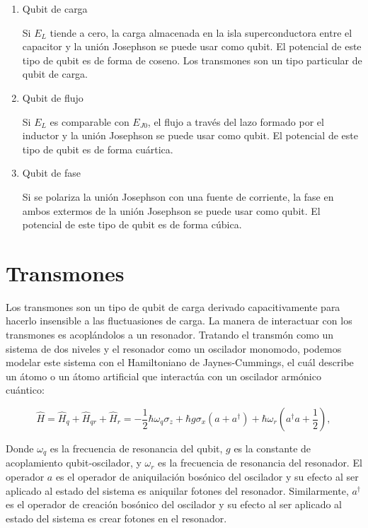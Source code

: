 \begin{enumerate}
    \item Qubit de carga

        Si $E_L$ tiende a cero, la carga almacenada en la isla superconductora entre el capacitor y  la unión Josephson se puede usar como qubit. El potencial de este tipo de qubit es de forma de coseno. Los transmones son un tipo particular de qubit de carga.

    \item Qubit de flujo

        Si $E_L$ es comparable con $E_{J0}$, el flujo a través del lazo formado por el inductor y la unión Josephson se puede usar como qubit. El potencial de este tipo de qubit es de forma cuártica.

    \item Qubit de fase

        Si se polariza la unión Josephson con una fuente de corriente, la fase en ambos extermos de la unión Josephson se puede usar como qubit. El potencial de este tipo de qubit es de forma cúbica.
\end{enumerate}

\section{Transmones}

Los transmones son un tipo de qubit de carga derivado capacitivamente para hacerlo insensible a las fluctuasiones de carga. La manera de interactuar con los transmones es acoplándolos a un resonador. Tratando el transmón como un sistema de dos niveles y el resonador como un oscilador monomodo, podemos modelar este sistema con el Hamiltoniano de Jaynes-Cummings, el cuál describe un átomo o un átomo artificial que interactúa con un oscilador armónico cuántico:

\begin{equation}
    \hat{H} = \hat{H}_q + \hat{H}_{qr} + \hat{H}_r = -\frac{1}{2} \hbar \omega_q \sigma_z + \hbar g \sigma_x (a+a^\dag) + \hbar \omega_r (a^\dag a + \frac{1}{2}) ,
\end{equation}

Donde $\omega_q$ es la frecuencia de resonancia del qubit, $g$ es la constante de acoplamiento qubit-oscilador, y $\omega_r$ es la frecuencia de resonancia del resonador. El operador $a$ es el operador de aniquilación bosónico del oscilador y su efecto al ser aplicado al estado del sistema es aniquilar fotones del resonador. Similarmente, $a^\dagger$ es el operador de creación bosónico del oscilador y su efecto al ser aplicado al estado del sistema es crear fotones en el resonador.

